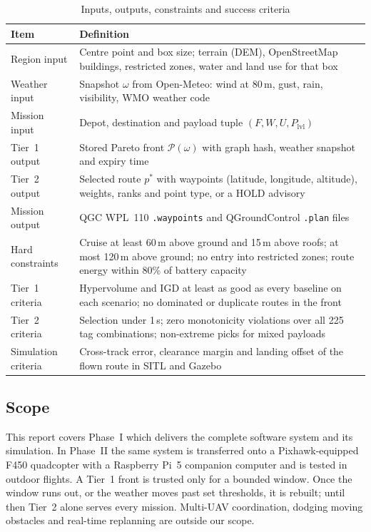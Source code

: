 \begin{table}[!htbp]
\centering
\caption{Inputs, outputs, constraints and success criteria}\label{tab:ps-io}
\small
\begin{tabular}{|P{3.3cm}|P{11.2cm}|}
\hline
\textbf{Item} & \textbf{Definition}\\
\hline
Region input & Centre point and box size; terrain (DEM), OpenStreetMap buildings, restricted zones, water and land use for that box\\
\hline
Weather input & Snapshot $\omega$ from Open-Meteo: wind at 80\,m, gust, rain, visibility, WMO weather code\\
\hline
Mission input & Depot, destination and payload tuple $(F, W, U, P_\mathrm{lvl})$\\
\hline
Tier~1 output & Stored Pareto front $\mathcal{P}(\omega)$ with graph hash, weather snapshot and expiry time\\
\hline
Tier~2 output & Selected route $p^*$ with waypoints (latitude, longitude, altitude), weights, ranks and point type, or a HOLD advisory\\
\hline
Mission output & QGC WPL~110 \texttt{.waypoints} and QGroundControl \texttt{.plan} files\\
\hline
Hard constraints & Cruise at least 60\,m above ground and 15\,m above roofs; at most 120\,m above ground; no entry into restricted zones; route energy within 80\% of battery capacity\\
\hline
Tier~1 criteria & Hypervolume and IGD at least as good as every baseline on each scenario; no dominated or duplicate routes in the front\\
\hline
Tier~2 criteria & Selection under 1\,s; zero monotonicity violations over all 225 tag combinations; non-extreme picks for mixed payloads\\
\hline
Simulation criteria & Cross-track error, clearance margin and landing offset of the flown route in SITL and Gazebo\\
\hline
\end{tabular}
\end{table}

\subsection{Scope}

This report covers Phase~I which delivers the complete software system and its
simulation. In Phase~II the same system is transferred onto a Pixhawk-equipped F450
quadcopter with a Raspberry Pi~5 companion computer and is tested in outdoor flights. A
Tier~1 front is trusted only for a bounded window. Once the window runs out, or the
weather moves past set thresholds, it is rebuilt; until then Tier~2 alone serves every
mission. Multi-UAV coordination, dodging moving obstacles and real-time replanning are
outside our scope.

